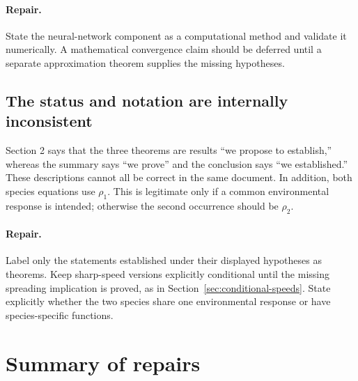 \documentclass[11pt]{article}
\theoremstyle{definition}
\begin{document}
\paragraph{Repair.}
State the neural-network component as a computational method and validate it
numerically.  A mathematical convergence claim should be deferred until a
separate approximation theorem supplies the missing hypotheses.

\subsection{The status and notation are internally inconsistent}

Section 2 says that the three theorems are results ``we propose to
establish,'' whereas the summary says ``we prove'' and the conclusion says
``we established.''  These descriptions cannot all be correct in the same
document.  In addition, both species equations use \(\rho_1\).  This is
legitimate only if a common environmental response is intended; otherwise
the second occurrence should be \(\rho_2\).

\paragraph{Repair.}
Label only the statements established under their displayed hypotheses as
theorems.  Keep sharp-speed versions explicitly conditional until the
missing spreading implication is proved, as in
Section~\ref{sec:conditional-speeds}.  State explicitly whether the two
species share one environmental response or have species-specific functions.

\section{Summary of repairs}
\end{document}
